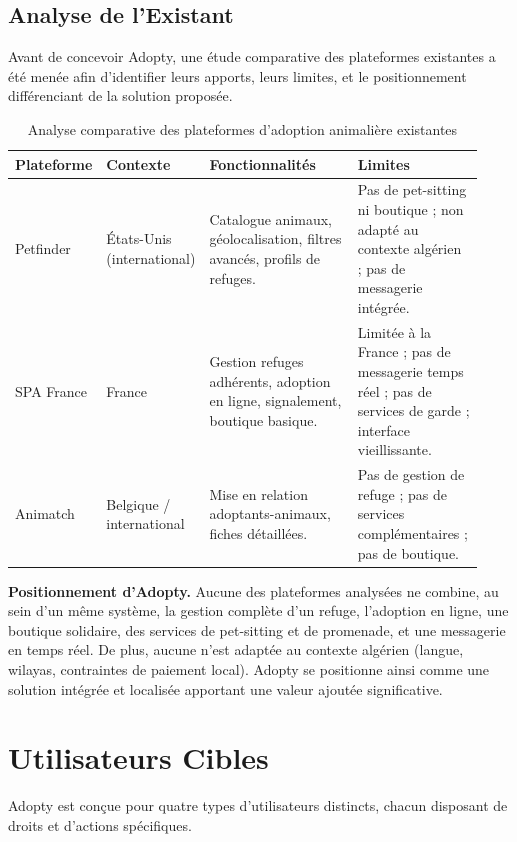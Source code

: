 \documentclass[12pt,a4paper]{report}
\begin{document}
\subsection{Analyse de l'Existant}

Avant de concevoir Adopty, une étude comparative des plateformes existantes a été menée afin d'identifier leurs apports, leurs limites, et le positionnement différenciant de la solution proposée.

\begin{table}[H]
\centering
\begin{tabular}{@{}L{0.17\linewidth}L{0.17\linewidth}L{0.32\linewidth}L{0.27\linewidth}@{}}
\toprule
\textbf{Plateforme} & \textbf{Contexte} & \textbf{Fonctionnalités} & \textbf{Limites} \\
\midrule
Petfinder
  & États-Unis (international)
  & Catalogue animaux, géolocalisation, filtres avancés, profils de refuges.
  & Pas de pet-sitting ni boutique ; non adapté au contexte algérien ; pas de messagerie intégrée. \\[6pt]
SPA France
  & France
  & Gestion refuges adhérents, adoption en ligne, signalement, boutique basique.
  & Limitée à la France ; pas de messagerie temps réel ; pas de services de garde ; interface vieillissante. \\[6pt]
Animatch
  & Belgique / international
  & Mise en relation adoptants-animaux, fiches détaillées.
  & Pas de gestion de refuge ; pas de services complémentaires ; pas de boutique. \\
\bottomrule
\end{tabular}
\caption{Analyse comparative des plateformes d'adoption animalière existantes}
\label{tab:existant}
\end{table}

\textbf{Positionnement d'Adopty.} Aucune des plateformes analysées ne combine, au sein d'un même système, la gestion complète d'un refuge, l'adoption en ligne, une boutique solidaire, des services de pet-sitting et de promenade, et une messagerie en temps réel. De plus, aucune n'est adaptée au contexte algérien (langue, wilayas, contraintes de paiement local). Adopty se positionne ainsi comme une solution intégrée et localisée apportant une valeur ajoutée significative.

\section{Utilisateurs Cibles}

Adopty est conçue pour quatre types d'utilisateurs distincts, chacun disposant de droits et d'actions spécifiques.
\end{document}
